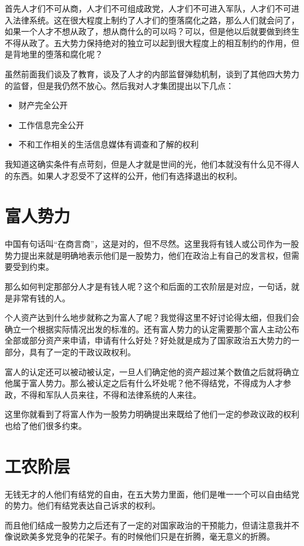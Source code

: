 \documentclass[11pt,oneside]{article}
\begin{document}
\begin{common-format}
首先人才们不可从商，人才们不可组成政党，人才们不可进入军队，人才们不可进入法律系统。这在很大程度上制约了人才们的堕落腐化之路，那么人们就会问了，如果一个人才不想从政了，想从商什么的可以吗？可以，但是他以后就要做到终生不得从政了。五大势力保持绝对的独立可以起到很大程度上的相互制约的作用，但是背地里的堕落和腐化呢？

虽然前面我们谈及了教育，谈及了人才的内部监督弹劾机制，谈到了其他四大势力的监督，但是我仍然不放心。然后我对人才集团提出以下几点：
\begin{itemize}
\item 财产完全公开
\item 工作信息完全公开
\item 不和工作相关的生活信息媒体有调查和了解的权利
\end{itemize}

我知道这确实条件有点苛刻，但是人才就是世间的光，他们本就没有什么见不得人的东西。如果人才忍受不了这样的公开，他们有选择退出的权利。


\section{富人势力}
中国有句话叫“在商言商”，这是对的，但不尽然。这里我将有钱人或公司作为一股势力提出来就是明确地表示他们是一股势力，他们在政治上有自己的发言权，但需要受到约束。

那么如何判定那部分人才是有钱人呢？这个和后面的工农阶层是对应，一句话，就是非常有钱的人。

个人资产达到什么地步就称之为富人了呢？我觉得这里不好讨论得太细，但我们会确立一个根据实际情况出发的标准的。还有富人势力的认定需要那个富人主动公布全部或部分资产来申请，申请有什么好处？好处就是成为了国家政治五大势力的一部分，具有了一定的干政议政权利。

富人的认定还可以被动被认定，一旦人们确定他的资产超过某个数值之后就将确立他属于富人势力。那么被认定之后有什么坏处呢？他不得结党，不得成为人才参政，不得和军队人员来往，不得和法律系统的人来往。

这里你就看到了将富人作为一股势力明确提出来既给了他们一定的参政议政的权利也给了他们很多约束。


\section{工农阶层}
无钱无才的人他们有结党的自由，在五大势力里面，他们是唯一一个可以自由结党的势力。他们有结党表达自己诉求的权利。

而且他们结成一股势力之后还有了一定的对国家政治的干预能力，但请注意我并不像说欧美多党竞争的花架子。有的时候他们只是在折腾，毫无意义的折腾。


\end{common-format}
\end{document}
